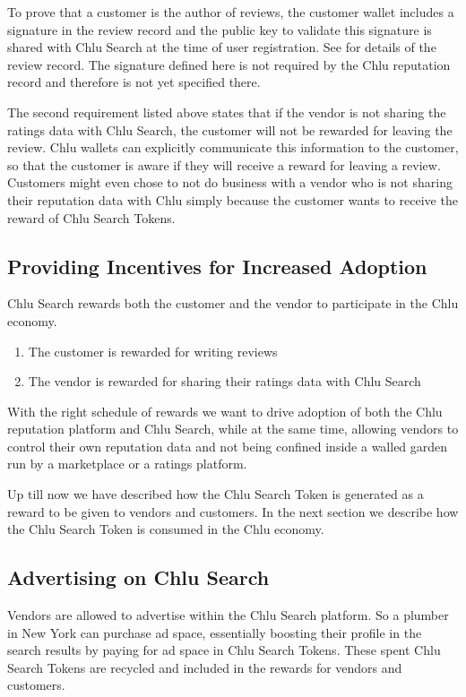 \documentclass[a4paper]{article}
\begin{document}
To prove that a customer is the author of reviews, the customer wallet
includes a signature in the review record and the public key to
validate this signature is shared with Chlu Search at the time of user
registration. See \cite{chlu-repuation} for details of the review
record. The signature defined here is not required by the Chlu
reputation record and therefore is not yet specified there.

The second requirement listed above states that if the vendor is not
sharing the ratings data with Chlu Search, the customer will not be
rewarded for leaving the review. Chlu wallets can explicitly
communicate this information to the customer, so that the customer is
aware if they will receive a reward for leaving a review. Customers
might even chose to not do business with a vendor who is not sharing
their reputation data with Chlu simply because the customer wants to
receive the reward of Chlu Search Tokens.

\subsection{Providing Incentives for Increased Adoption}

Chlu Search rewards both the customer and the vendor to participate in
the Chlu economy.

\begin{enumerate}
\item The customer is rewarded for writing reviews
\item The vendor is rewarded for sharing their ratings data with Chlu
  Search
\end{enumerate}

With the right schedule of rewards we want to drive adoption of both
the Chlu reputation platform and Chlu Search, while at the same time,
allowing vendors to control their own reputation data and not being
confined inside a walled garden run by a marketplace or a ratings
platform.

Up till now we have described how the Chlu Search Token is generated
as a reward to be given to vendors and customers. In the next section
we describe how the Chlu Search Token is consumed in the Chlu economy.

\subsection{Advertising on Chlu Search}

Vendors are allowed to advertise within the Chlu Search platform. So a
plumber in New York can purchase ad space, essentially boosting their
profile in the search results by paying for ad space in Chlu Search
Tokens. These spent Chlu Search Tokens are recycled and included in
the rewards for vendors and customers.
\end{document}
